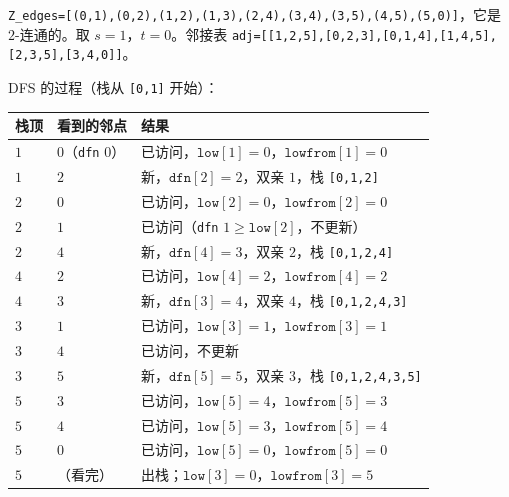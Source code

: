 \begin{example}\label{ex:st-numbering:dfs}
\texttt{Z\_edges=[(0,1),(0,2),(1,2),(1,3),(2,4),(3,4),(3,5),(4,5),(5,0)]}，它是 $2$-连通的。取 $s=1$，$t=0$。邻接表 \texttt{adj=[[1,2,5],[0,2,3],[0,1,4],[1,4,5],[2,3,5],[3,4,0]]}。
\begin{center}
\end{center}
DFS 的过程（栈从 \texttt{[0,1]} 开始）：
\begin{center}
\small
\begin{tabular}{lll}
\toprule
栈顶 & 看到的邻点 & 结果 \\
\midrule
$1$ & $0$（\texttt{dfn} $0$） & 已访问，$\texttt{low}[1]=0$，$\texttt{lowfrom}[1]=0$ \\
$1$ & $2$ & 新，$\texttt{dfn}[2]=2$，双亲 $1$，栈 \texttt{[0,1,2]} \\
$2$ & $0$ & 已访问，$\texttt{low}[2]=0$，$\texttt{lowfrom}[2]=0$ \\
$2$ & $1$ & 已访问（\texttt{dfn} $1\geqslant\texttt{low}[2]$，不更新） \\
$2$ & $4$ & 新，$\texttt{dfn}[4]=3$，双亲 $2$，栈 \texttt{[0,1,2,4]} \\
$4$ & $2$ & 已访问，$\texttt{low}[4]=2$，$\texttt{lowfrom}[4]=2$ \\
$4$ & $3$ & 新，$\texttt{dfn}[3]=4$，双亲 $4$，栈 \texttt{[0,1,2,4,3]} \\
$3$ & $1$ & 已访问，$\texttt{low}[3]=1$，$\texttt{lowfrom}[3]=1$ \\
$3$ & $4$ & 已访问，不更新 \\
$3$ & $5$ & 新，$\texttt{dfn}[5]=5$，双亲 $3$，栈 \texttt{[0,1,2,4,3,5]} \\
$5$ & $3$ & 已访问，$\texttt{low}[5]=4$，$\texttt{lowfrom}[5]=3$ \\
$5$ & $4$ & 已访问，$\texttt{low}[5]=3$，$\texttt{lowfrom}[5]=4$ \\
$5$ & $0$ & 已访问，$\texttt{low}[5]=0$，$\texttt{lowfrom}[5]=0$ \\
$5$ & （看完） & 出栈；$\texttt{low}[3]=0$，$\texttt{lowfrom}[3]=5$ \\

\end{tabular}
\end{center}
\end{example}
